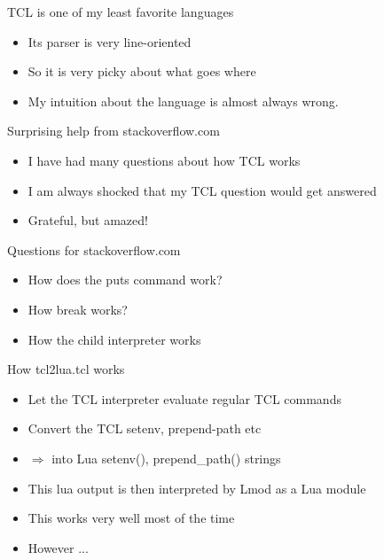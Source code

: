 \documentclass{beamer}
\begin{document}
\begin{frame}{TCL is one of my least favorite languages}
  \begin{itemize}
    \item Its parser is very line-oriented
    \item So it is very picky about what goes where
    \item My intuition about the language is almost always wrong.
  \end{itemize}
\end{frame}

\begin{frame}{Surprising help from stackoverflow.com}
  \begin{itemize}
    \item I have had many questions about how TCL works
    \item I am always shocked that my TCL question would get answered
    \item Grateful, but amazed!
  \end{itemize}
\end{frame}

\begin{frame}{Questions for stackoverflow.com}
  \begin{itemize}
    \item How does the puts command work?
    \item How break works?
    \item How the child interpreter works
  \end{itemize}
\end{frame}

\begin{frame}{How tcl2lua.tcl works}
  \begin{itemize}
    \item Let the TCL interpreter evaluate regular TCL commands
    \item Convert the TCL setenv, prepend-path etc
    \item $\Rightarrow$ into Lua setenv(), prepend\_path() strings
    \item This lua output is then interpreted by Lmod as a Lua module
    \item This works very well most of the time
    \item However ...
  \end{itemize}
\end{frame}
\end{document}
